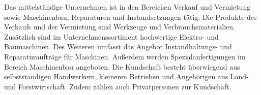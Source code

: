 Das mittelständige Unternehmen ist in den Bereichen Verkauf und Vermietung sowie Maschinenbau, Reparaturen und Instandsetzungen tätig. Die Produkte des Verkaufs und der Vermietung sind Werkzeuge und Verbrauchsmaterialien. Zusätzlich sind im Unternehmenssortiment hochwertige Elektro- und Baumaschinen. Des Weiteren umfasst das Angebot Instandhaltungs- und Reparaturaufträge für Maschinen. Außerdem werden Spezialanfertigungen im Bereich Maschinenbau angeboten. Die Kundschaft besteht überwiegend aus selbstständigen Handwerkern, kleineren Betrieben und Angehörigen aus Land- und Forstwirtschaft. Zudem zählen auch Privatpersonen zur Kundschaft. \cite{einleitung1}